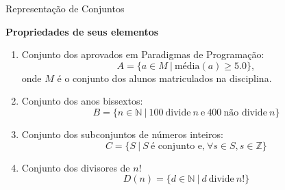 \begin{frame}[fragile]{Representação de Conjuntos}

    \textbf{Propriedades de seus elementos}

    \vspace{0.1in}

    \begin{enumerate}

        \item Conjunto dos aprovados em Paradigmas de Programação:
        \[
            A = \lbrace a\in M\ |\ \mbox{média}(a) \geq 5.0 \rbrace,
        \]
        onde $M$ é o conjunto dos alunos matriculados na disciplina.

        \item Conjunto dos anos bissextos:
        \[
            B = \lbrace n\in\mathbb{N}\ |\ 100\ \mbox{divide}\ n\ \mbox{e} \ 400\ \mbox{não divide}\ n\rbrace
        \]

        \item Conjunto dos subconjuntos de números inteiros:
        \[
            C = \lbrace S\ |\ S\ \mbox{é conjunto e,}\ \forall s\in S, s\in \mathbb{Z}\rbrace
        \]

        \item Conjunto dos divisores de $n!$
        \[
            D(n) = \lbrace d\in \mathbb{N}\ |\ d\ \mbox{divide}\ n!\rbrace
        \]
    \end{enumerate}

\end{frame}

